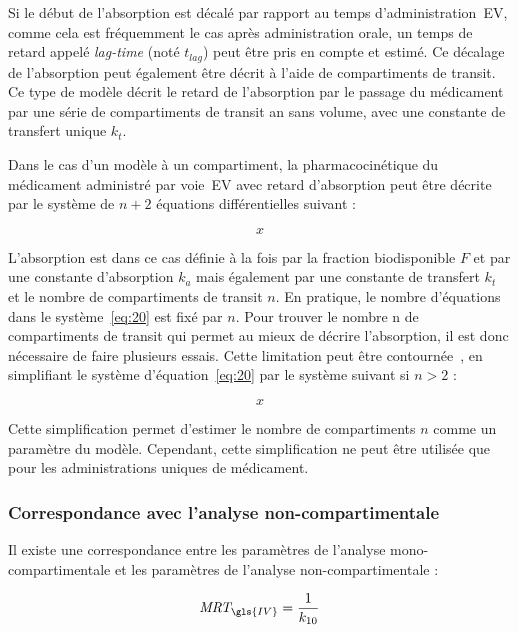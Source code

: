 Si le début de l'absorption est décalé par rapport au temps d'administration~\gls{EV}, comme cela est fréquemment le cas après administration orale, un temps de retard appelé \textit{lag-time} (noté $t_{lag}$) peut être pris en compte et estimé. Ce décalage de l'absorption peut également être décrit à l'aide de compartiments de transit. Ce type de modèle décrit le retard de l'absorption par le passage du médicament par une série de compartiments de transit an sans volume, avec une constante de transfert unique $k_t$.

Dans le cas d'un modèle à un compartiment, la pharmacocinétique du médicament administré par voie~\gls{EV} avec retard d'absorption peut être décrite par le système de $n+2$ équations différentielles suivant :

\begin{equation}
x
\label{eq:20}
\end{equation}

L'absorption est dans ce cas définie à la fois par la fraction biodisponible $F$ et par une constante d'absorption $k_{a}$ mais également par une constante de transfert $k_t$ et le nombre de compartiments de transit $n$. En pratique, le nombre d'équations dans le système~\ref{eq:20} est fixé par $n$. Pour trouver le nombre n de compartiments de transit qui permet au mieux de décrire l'absorption, il est donc nécessaire de faire plusieurs essais. Cette limitation peut être contournée~\citep{REF1}, en simplifiant le système d'équation~\ref{eq:20} par le système suivant si $n > 2$ :

\begin{equation}
x
\label{eq:21}
\end{equation}

Cette simplification permet d'estimer le nombre de compartiments $n$ comme un paramètre du modèle. Cependant, cette simplification ne peut être utilisée que pour les administrations uniques de médicament.

\subsubsection{Correspondance avec l'analyse non-compartimentale}
Il existe une correspondance entre les paramètres de l'analyse mono-compartimentale et les paramètres de l'analyse non-compartimentale :

\begin{equation}
\MRT_{\gls{IV}} = \frac{1}{k_{10}}
\label{eq:22}
\end{equation}


